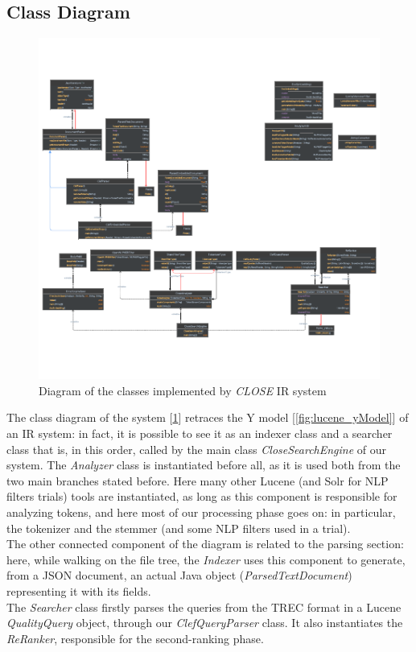 \newpage
\subsection{Class Diagram}

\begin{figure}[!h]
    \centering
    \includegraphics[height=0.65\textheight, angle =90, keepaspectratio]{figure/Classes_diagram_white_crop.pdf}
    \caption{Diagram of the classes implemented by \textit{CLOSE} \ac{IR} system}
    \label{fig:Classes_diagram_white}
\end{figure}
\clearpage
The class diagram of the system [\ref{fig:Classes_diagram_white}] retraces the Y model [\ref{fig:lucene_yModel}] of an IR system: in fact, it is possible to see it as an indexer class and a searcher class that is, in this order,
called by the main class \textit{CloseSearchEngine} of our system. The \textit{Analyzer} class is instantiated before all, as it is used both from the two main branches stated before. Here many other Lucene (and Solr for NLP filters trials) tools are instantiated, as long as this component
is responsible for analyzing tokens, and here most of our processing phase goes on: in particular, the tokenizer and the stemmer (and some NLP filters used in a trial).\\
The other connected component of the diagram is related to the parsing section: here, while walking on the file tree, the \textit{Indexer} uses this component to generate, from a JSON document, an actual Java object (\textit{ParsedTextDocument}) representing it with its fields.\\
The \textit{Searcher} class firstly parses the queries from the \ac{TREC} format in a Lucene \textit{QualityQuery} object, through our \textit{ClefQueryParser} class. It also instantiates the \textit{ReRanker}, responsible for the second-ranking phase.\\

